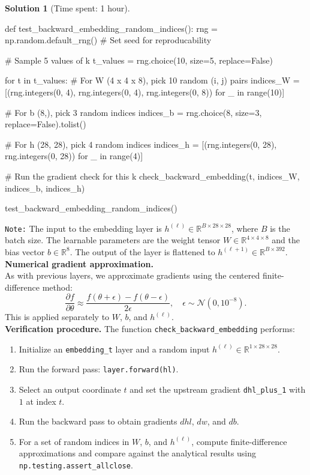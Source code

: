 \documentclass[11pt, reqno, letterpaper, twoside]{amsart}
\theoremstyle{plain}
\theoremstyle{definition}
\newtheorem{solution}[theorem]{Solution}
\begin{document}
\begin{solution}[Time spent: 1 hour]
\begin{enumerate}
\begin{python}
def test_backward_embedding_random_indices():
    rng = np.random.default_rng() # Set seed for reproducability

    # Sample 5 values of k
    t_values = rng.choice(10, size=5, replace=False)

    for t in t_values:
        # For W (4 x 4 x 8), pick 10 random (i, j) pairs
        indices_W = [(rng.integers(0, 4), rng.integers(0, 4), rng.integers(0, 8)) for _ in range(10)]
        
        # For b (8,), pick 3 random indices
        indices_b = rng.choice(8, size=3, replace=False).tolist()
        
        # For h (28, 28), pick 4 random indices
        indices_h = [(rng.integers(0, 28), rng.integers(0, 28)) for _ in range(4)]

        # Run the gradient check for this k
        check_backward_embedding(t, indices_W, indices_b, indices_h)

test_backward_embedding_random_indices()
\end{python}

\texttt{Note:} The input to the embedding layer is $h^{(\ell)} \in \mathbb{R}^{B \times 28 \times 28}$, where $B$ is the batch size.  
The learnable parameters are the weight tensor $W \in \mathbb{R}^{4 \times 4 \times 8}$ and the bias vector $b \in \mathbb{R}^{8}$.  
The output of the layer is flattened to $h^{(\ell+1)} \in \mathbb{R}^{B \times 392}$. \\

\textbf{Numerical gradient approximation.} \\
As with previous layers, we approximate gradients using the centered finite-difference method:
\[
\frac{\partial f}{\partial \theta} \approx \frac{f(\theta + \epsilon) - f(\theta - \epsilon)}{2\epsilon}, \quad \epsilon \sim \mathcal{N}(0,10^{-8}).
\]
This is applied separately to $W$, $b$, and $h^{(\ell)}$. \\

\textbf{Verification procedure.}
The function \verb|check_backward_embedding| performs:
\begin{enumerate}
  \item Initialize an \verb|embedding_t| layer and a random input $h^{(\ell)} \in \mathbb{R}^{1 \times 28 \times 28}$.
  \item Run the forward pass: \verb|layer.forward(hl)|.
  \item Select an output coordinate $t$ and set the upstream gradient \verb|dhl_plus_1| with $1$ at index $t$.
  \item Run the backward pass to obtain gradients $dhl$, $dw$, and $db$.
  \item For a set of random indices in $W$, $b$, and $h^{(\ell)}$, compute finite-difference approximations and compare against the analytical results using \verb|np.testing.assert_allclose|. \\
\end{enumerate}


\end{enumerate}
\end{solution}
\end{document}
